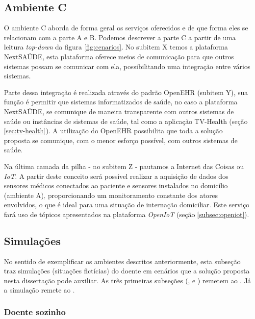 \subsection{Ambiente C} \label{subsec:ambiente-c}

O ambiente C aborda de forma geral os serviços oferecidos e de que forma eles se
relacionam com a parte A e B. Podemos descrever a parte C a partir de uma leitura 
\textit{top-down} da figura \ref{fig:cenarios}. No subitem X temos a plataforma
NextSAÚDE, esta plataforma oferece meios de comunicação para que outros sistemas
possam se comunicar com ela, possibilitando uma integração entre vários sistemas.

Parte dessa integração é realizada através do padrão OpenEHR (subitem Y), sua 
função é permitir que sistemas informatizados de saúde, no caso a plataforma
NextSAÚDE, se comunique de maneira transparente com outros sistemas de saúde ou
instâncias de sistemas de saúde, tal como a aplicação TV-Health (seção
\vref{sec:tv-health}). A utilização do OpenEHR possibilita que toda a solução
proposta se comunique, com o menor esforço possível, com outros sistemas de 
saúde.

Na última camada da pilha - no subitem Z - pautamos a Internet das Coisas ou
\textit{IoT}. A partir deste conceito será possível realizar a aquisição de
dados dos sensores médicos conectados ao paciente e sensores instalados no domicílio
(ambiente A), proporcionando um monitoramento constante dos atores envolvidos, 
o que é ideal para uma situação de internação domiciliar. Este serviço fará uso 
de tópicos apresentados na plataforma \textit{OpenIoT}
(seção \vref{subsec:openiot}).

\subsection{Simulações} \label{subsec:simulacoes}

No sentido de exemplificar os ambientes descritos anteriormente, esta subseção
traz simulações (situações fictícias) do doente em cenários que a solução
proposta nesta dissertação pode auxiliar. As três primeiras subseções 
(, 
e ) remetem ao .
Já a simulação  remete ao .

\subsubsection{Doente sozinho} \label{subsubsec:doente-sozinho}

